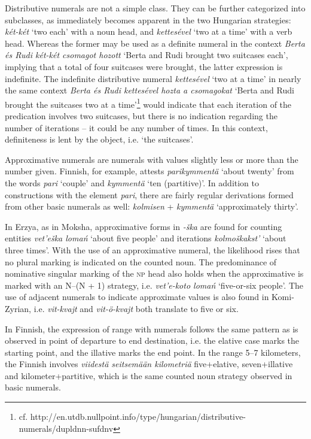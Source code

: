 \documentclass[free]{flammie}
\begin{document}
Distributive numerals are not a simple class. They can be further categorized
into subclasses, as immediately becomes apparent in the two Hungarian
strategies: \textit{két-két} `two each' with a noun head, and
\textit{kettesével} `two at a time' with a verb head. Whereas the former may be
used as a definite numeral in the context \textit{Berta és Rudi két-két csomagot
hozott} `Berta and Rudi brought two suitcases each', implying that a total of
four suitcases were brought, the latter expression is indefinite. The indefinite
distributive numeral \textit{kettesével} `two at a time' in nearly the same
context \textit{Berta és Rudi kettesével hozta a csomagokat} `Berta and Rudi
brought the suitcases two at a time'\footnote{cf.
http://en.utdb.nullpoint.info/type/hungarian/distributive-numerals/dupldnn-sufdnv}
would indicate that each iteration of the predication involves two suitcases,
but there is no indication regarding the number of iterations -- it could be any
number of times. In this context, definiteness is lent by the object, i.e. `the
suitcases'.


Approximative numerals are numerals with values slightly less or more than the
number given. Finnish, for example, attests \textit{parikymmentä} `about twenty'
from the words \textit{pari} `couple' and \textit{kymmentä} `ten (partitive)'.
In addition to constructions with the element \textit{pari}, there are fairly
regular derivations formed from other basic numerals as well: \textit{kolmisen}
+ \textit{kymmentä} `approximately thirty'.

In Erzya, as in Moksha, approximative forms in \textit{-ška} are found for
counting entities \textit{vet'eška lomań} `about five people' and iterations
\textit{kolmoškakst'} `about three times'. With the use of an approximative
numeral, the likelihood rises that no plural marking is indicated on the counted
noun. The predominance of nominative singular marking of the \textsc{np} head
also holds when the approximative is marked with an N–(N + 1) strategy, i.e.
\textit{vet'e-koto lomań} `five-or-six people'. The use of adjacent numerals to
indicate approximate values is also found in Komi-Zyrian, i.e.
\textit{vit-kvajt} and \textit{vit-ö-kvajt} both translate to five or six.

In Finnish, the expression of range with numerals follows the same pattern as is
observed in point of departure to end destination, i.e. the elative case marks
the starting point, and the illative marks the end point. In the range 5--7
kilometers, the Finnish involves \textit{viidestä seitsemään kilometriä}
five+elative, seven+illative and kilometer+partitive, which is the same counted
noun strategy observed in basic numerals.
\end{document}
